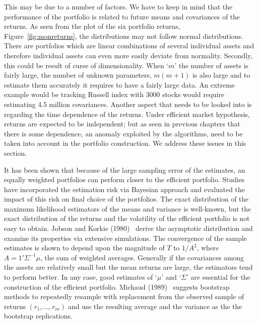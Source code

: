 This may be due to a number of factors. We have to keep in mind that the performance of the portfolio is related to future means and covariances of the returns. As seen from the plot of the six portfolio returns, Figure~\ref{fig:monreturns}, the distributions may not follow normal distributions. There are portfolios which are linear combinations of several individual assets and therefore individual assets can even more easily deviate from normality. Secondly, this could be result of curse of dimensionality. When `$m$' the number of assets is fairly large, the number of unknown parameters, $m(m+1)$ is also large and to estimate them accurately it requires to have a fairly large data. An extreme example would be tracking Russell index with 3000 stocks would require estimating 4.5 million covariances. Another aspect that needs to be looked into is regarding the time dependence of the returns. Under efficient market hypothesis, returns are expected to be independent; but as seen in previous chapters that there is some dependence, an anomaly exploited by the algorithms, need to be taken into account in the portfolio construction. We address these issues in this section. 


It has been shown that because of the large sampling error of the estimates, an equally weighted portfolios can perform closer to the efficient portfolio. Studies have incorporated the estimation risk via Bayesian approach and evaluated the impact of this risk on final choice of the portfolios. The exact distribution of the maximum likelihood estimators of the means and variance is well-known, but the exact distribution of the returns and the volatility of the efficient portfolio is not easy to obtain. Jobson and Korkie (1980)~\cite{jobkor} derive the asymptotic distribution and examine its properties via extensive simulations. The convergence of the sample estimates is shown to depend upon the magnitude of $T$ to $1/A^2$, where $A=1' \Sigma^{-1}\mu$, the sum of weighted averages. Generally if the covariances among the assets are relatively small but the mean returns are large, the estimators tend to perform better. In any case, good estimates of `$\mu$' and `$\Sigma$' are essential for the construction of the efficient portfolio. Michaud (1989)~\cite{michaud} suggests bootstrap methods to repeatedly resample with replacement from the observed sample of returns $(r_1,\ldots,r_m)$ and use the resulting average and the variance as the the bootstrap replications. \\


